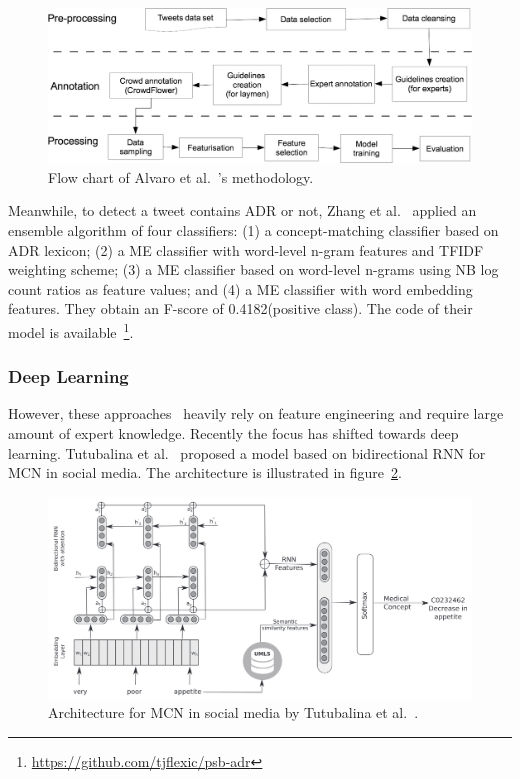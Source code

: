\begin{figure}[h]
	\centering
	\includegraphics[width=0.99\linewidth]{Figures/n.jpg}
	\caption{Flow chart of Alvaro et al.~\cite{alvaro2015crowdsourcing}’s methodology.}
	\label{fig:flowchart-alvaro}
\end{figure}

Meanwhile, to detect a tweet contains ADR or not, Zhang et al.~\cite{zhang2016ensemble} applied an ensemble algorithm of four classifiers: (1) a concept-matching classifier based on ADR lexicon; (2) a ME classifier with word-level n-gram features and TFIDF weighting scheme; (3) a ME classifier based on word-level n-grams using NB log count ratios as feature values; and (4) a ME classifier with word embedding features. They obtain an F-score of 0.4182(positive class). The code of their model is available~\footnote{\url{https://github.com/tjflexic/psb-adr}}.

\subsubsection{Deep Learning}

However, these approaches~\cite{sarker2016social, alvaro2015crowdsourcing, zhang2016ensemble} heavily rely on feature engineering and require large amount of expert knowledge. Recently the focus has shifted towards deep learning. Tutubalina et al.~\cite{TUTUBALINA201893} proposed a model based on bidirectional RNN for MCN in social media. The architecture is illustrated in figure~\ref{fig:architecture-tutubalina}.

\begin{figure}[h]
	\centering
	\includegraphics[width=0.99\linewidth]{Figures/f.png}
	\caption{Architecture for MCN in social media by Tutubalina et al.~\cite{TUTUBALINA201893}.}
	\label{fig:architecture-tutubalina}
\end{figure}

